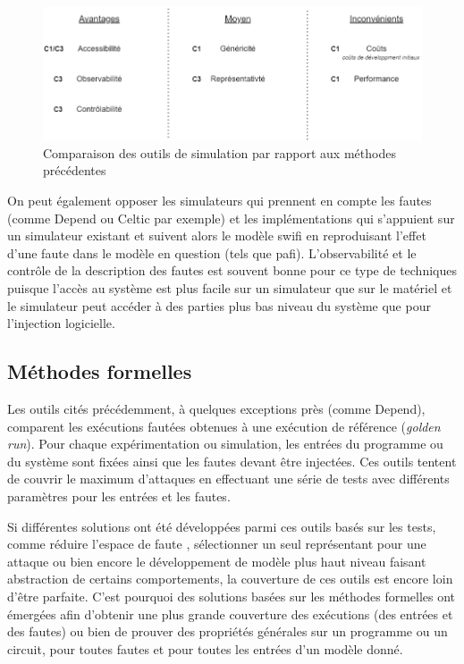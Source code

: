                 \begin{figure}[hbt]\centering
                  \includegraphics[scale=.56]{ch2-background/img/advantages-simu.drawio.png}
                  \caption{Comparaison des outils de simulation par rapport aux méthodes précédentes}
                  \label{fig:soa-tools-scheme-simu}
                \end{figure}
                
                On peut également opposer les simulateurs qui prennent en compte les fautes (comme Depend ou Celtic par exemple) et les implémentations qui s'appuient sur un simulateur existant et suivent alors le modèle \gls{swifi} en reproduisant l'effet d'une faute dans le modèle en question (tels que \gls{pafi}). 
                L'observabilité et le contrôle de la description des fautes est souvent bonne pour ce type de techniques puisque l'accès au système est plus facile sur un simulateur que sur le matériel et le simulateur peut accéder à des parties plus bas niveau du système que pour l'injection logicielle.
                
        \subsection{Méthodes formelles}
        \label{sec:soa-tools-formal}
            
            Les outils cités précédemment, à quelques exceptions près (comme Depend), comparent les exécutions fautées obtenues à une exécution de référence (\textit{golden run}). Pour chaque expérimentation ou simulation, les entrées du programme ou du système sont fixées ainsi que les fautes devant être injectées. Ces outils tentent de couvrir le maximum d'attaques en effectuant une série de tests avec différents paramètres pour les entrées et les fautes.
            
            Si différentes solutions ont été développées parmi ces outils basés sur les tests, comme réduire l'espace de faute \cite{Benso/TODAES98}, sélectionner un seul représentant pour une attaque \cite{Schmidt/Austrochip07} ou bien encore le développement de modèle plus haut niveau faisant abstraction de certains comportements, la couverture de ces outils est encore loin d'être parfaite. C'est pourquoi des solutions basées sur les méthodes formelles ont émergées afin d'obtenir une plus grande couverture des exécutions (des entrées et des fautes) ou bien de prouver des propriétés générales sur un programme ou un circuit, pour toutes fautes et pour toutes les entrées d'un modèle donné.
            
